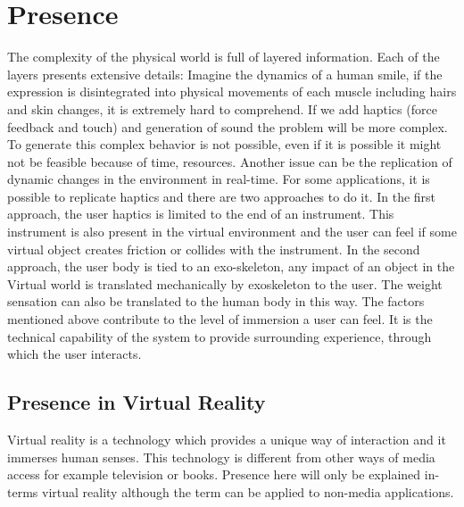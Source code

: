 \section{Presence}
The complexity of the physical world is full of layered information. Each of the layers presents extensive details: Imagine the dynamics of a human smile, if the expression is disintegrated into physical movements of each muscle including hairs and skin changes, it is extremely hard to comprehend. If we add haptics (force feedback and touch) and generation of sound the problem will be more complex. To generate this complex behavior is not possible, even if it is possible it might not be feasible because of time, resources. Another issue can be the replication of dynamic changes in the environment in real-time. For some applications, it is possible to replicate haptics and there are two approaches to do it. In the first approach, the user haptics is limited to the end of an instrument. This instrument is also present in the virtual environment and the user can feel if some virtual object creates friction or collides with the instrument. In the second approach, the user body is tied to an exo-skeleton, any impact of an object in the Virtual world is translated mechanically by exoskeleton to the user. The weight sensation can also be translated to the human body in this way. The factors mentioned above contribute to the level of immersion a user can feel. It is the technical capability of the system to provide surrounding experience, through which the user interacts.\cite{lampton1995distance}\citep{armbruster2005distance}\citep{laycock2003recent} 


\subsection{Presence in Virtual Reality}
Virtual reality is a technology which provides a unique way of interaction and it immerses human senses. This technology is different from other ways of media access for example television or books. Presence here will only be explained in-terms virtual reality although the term can be applied to non-media applications.

